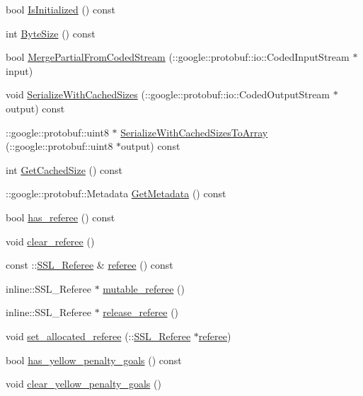 \begin{DoxyCompactItemize}
bool \hyperlink{class_save_state_a880449351424f5ac0fcc1fb829d5a328}{Is\-Initialized} () const 
\item 
int \hyperlink{class_save_state_a2e17d298aa8472cdb3af407a4e5cd888}{Byte\-Size} () const 
\item 
bool \hyperlink{class_save_state_a3ca71650fe5a5762819b25244446e160}{Merge\-Partial\-From\-Coded\-Stream} (\-::google\-::protobuf\-::io\-::\-Coded\-Input\-Stream $\ast$input)
\item 
void \hyperlink{class_save_state_a1e823603106045295486487baa5794d9}{Serialize\-With\-Cached\-Sizes} (\-::google\-::protobuf\-::io\-::\-Coded\-Output\-Stream $\ast$output) const 
\item 
\-::google\-::protobuf\-::uint8 $\ast$ \hyperlink{class_save_state_a0d1587f659b8905e24a66804a837ee7c}{Serialize\-With\-Cached\-Sizes\-To\-Array} (\-::google\-::protobuf\-::uint8 $\ast$output) const 
\item 
int \hyperlink{class_save_state_a7f1b40ede76826f636613aecb1d28379}{Get\-Cached\-Size} () const 
\item 
\-::google\-::protobuf\-::\-Metadata \hyperlink{class_save_state_a31a115c6e66c3b0fd45a6da85a36630f}{Get\-Metadata} () const 
\item 
bool \hyperlink{class_save_state_a3248660de7020b1350f2afaf5aa9ff16}{has\-\_\-referee} () const 
\item 
void \hyperlink{class_save_state_a78cdbbba9b3ac4a28dacbe0427ca353d}{clear\-\_\-referee} ()
\item 
const \-::\hyperlink{class_s_s_l___referee}{S\-S\-L\-\_\-\-Referee} \& \hyperlink{class_save_state_ab0750d983c8775ae1c70d9bf4719eb1c}{referee} () const 
\item 
inline\-::\-S\-S\-L\-\_\-\-Referee $\ast$ \hyperlink{class_save_state_a5abf1416b8a27ccf854c9acd5b3e0140}{mutable\-\_\-referee} ()
\item 
inline\-::\-S\-S\-L\-\_\-\-Referee $\ast$ \hyperlink{class_save_state_a851c06ad8b6470e6b1e8c3ec5da915d0}{release\-\_\-referee} ()
\item 
void \hyperlink{class_save_state_a1c10e02c5981d2f785b42efe9f4a45d1}{set\-\_\-allocated\-\_\-referee} (\-::\hyperlink{class_s_s_l___referee}{S\-S\-L\-\_\-\-Referee} $\ast$\hyperlink{class_save_state_ab0750d983c8775ae1c70d9bf4719eb1c}{referee})
\item 
bool \hyperlink{class_save_state_aba8328df1ffdae696aba6abba35a4269}{has\-\_\-yellow\-\_\-penalty\-\_\-goals} () const 
\item 
void \hyperlink{class_save_state_ad34e94698eec5e5efbe8379cf20fa378}{clear\-\_\-yellow\-\_\-penalty\-\_\-goals} ()

\end{DoxyCompactItemize}

